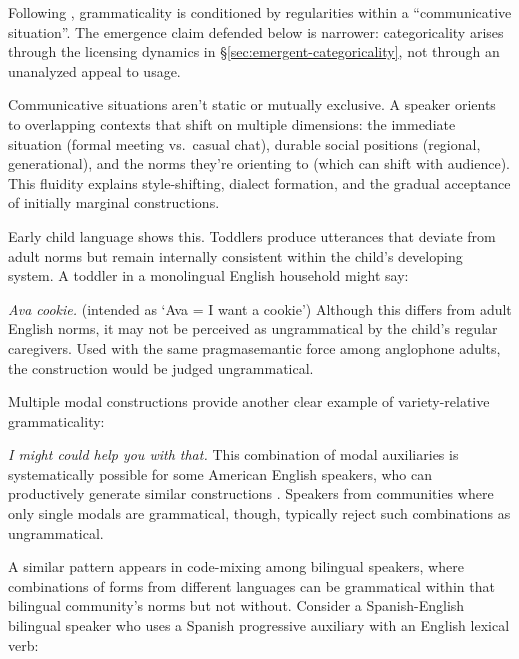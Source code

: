 \documentclass[12pt,letterpaper]{article}
\newcommand{\mention}[1]{\textit{#1}}
\begin{document}
Following \textcite[3]{wiese2023}, grammaticality is conditioned by regularities within a \enquote{communicative situation}. The emergence claim defended below is narrower: categoricality arises through the licensing dynamics in \S\ref{sec:emergent-categoricality}, not through an unanalyzed appeal to usage.

Communicative situations aren't static or mutually exclusive. A speaker orients to overlapping contexts that shift on multiple dimensions: the immediate situation (formal meeting vs.\ casual chat), durable social positions (regional, generational), and the norms they're orienting to (which can shift with audience). This fluidity explains style-shifting, dialect formation, and the gradual acceptance of initially marginal constructions.

Early child language shows this. Toddlers produce utterances that deviate from adult norms but remain internally consistent within the child's developing system. A toddler in a monolingual English household might say:

\ea
\mention{Ava cookie.} (intended as `Ava = I want a cookie')
\z
Although this differs from adult English norms, it may not be perceived as ungrammatical by the child's regular caregivers. Used with the same pragmasemantic force among anglophone adults, the construction would be judged ungrammatical.

Multiple modal constructions provide another clear example of variety-relative grammaticality:

\ea
\mention{I might could help you with that.}
\z
This combination of modal auxiliaries is systematically possible for some American English speakers, who can productively generate similar constructions \autocite{morin2024semantics}. Speakers from communities where only single modals are grammatical, though, typically reject such combinations as ungrammatical.

A similar pattern appears in code-mixing among bilingual speakers, where combinations of forms from different languages can be grammatical within that bilingual community's norms but not without. Consider a Spanish-English bilingual speaker who uses a Spanish progressive auxiliary with an English lexical verb:
\end{document}
